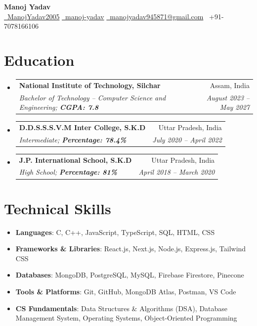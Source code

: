 \documentclass[a4paper,11pt]{article}
\makeatletter
\newcommand{\resumeItem}[2]{\item{\textbf{#1}{: #2 \vspace{-1pt}}}}
\newcommand{\resumeSubheading}[4]{
  \vspace{1pt}\item[]
    \begin{tabular*}{0.97\textwidth}{l@{\extracolsep{\fill}}r}
      \textbf{#1} & #2 \\
      \textit{#3} & \textit{#4} \\
    \end{tabular*}\vspace{-2pt}
}
\newcommand{\resumeSubItem}[2]{\resumeItem{#1}{#2}\vspace{-1pt}}
\newcommand{\resumeSubHeadingListStart}{\begin{itemize}[leftmargin=*]}
\newcommand{\resumeSubHeadingListEnd}{\end{itemize}\vspace{0pt}}
\makeatother
\begin{document}
\begin{center}
    {\huge \textbf{Manoj Yadav}} \\[4pt]
    \large
    \href{https://github.com/ManojYadav2005}{\faGithub~ManojYadav2005} \hspace{4pt}
    \href{https://www.linkedin.com/in/manoj-yadav-a0287827a/}{\faLinkedinSquare~manoj-yadav} \hspace{4pt}
    \href{mailto:manojyadav945871@gmail.com}{\faEnvelope~manojyadav945871@gmail.com} \hspace{4pt}
    {\faPhone~+91-7078166106}
\end{center}
\vspace{-28pt}

\section{Education}
\resumeSubHeadingListStart
  \resumeSubheading
    {National Institute of Technology, Silchar}{Assam, India}
    {Bachelor of Technology -- Computer Science and Engineering; \textbf{CGPA: 7.8}}{August 2023 -- May 2027}
  \resumeSubheading
    {D.D.S.S.S.V.M Inter College, S.K.D}{Uttar Pradesh, India}
    {Intermediate; \textbf{Percentage: 78.4\%}}{July 2020 -- April 2022}
  \resumeSubheading
     {J.P. International School, S.K.D}{Uttar Pradesh, India}
     {High School; \textbf{Percentage: 81\%}}{April 2018 --  March 2020}
\resumeSubHeadingListEnd
\vspace{-17pt}


\section{Technical Skills}
\begin{itemize}[leftmargin=*, label={}]
  \resumeSubItem{Languages}{C, C++, JavaScript, TypeScript, SQL, HTML, CSS}
  \resumeSubItem{Frameworks \& Libraries}{React.js, Next.js, Node.js, Express.js, Tailwind CSS}
  \resumeSubItem{Databases}{MongoDB, PostgreSQL, MySQL, Firebase Firestore, Pinecone}
  \resumeSubItem{Tools \& Platforms}{Git, GitHub, MongoDB Atlas, Postman, VS Code}
  \resumeSubItem{CS Fundamentals}{Data Structures \& Algorithms (DSA), Database Management System, Operating Systems, Object-Oriented Programming}
\end{itemize}
\vspace{-16pt}


\end{document}
